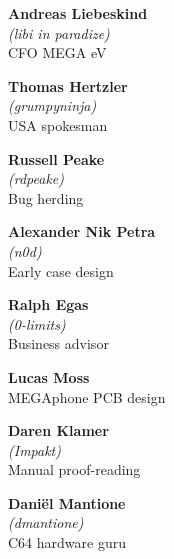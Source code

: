 \begin{mega65thanks}

\begin{minipage}{\linewidth}
  {\large\bf Andreas Liebeskind} \\
  \textit{(libi in paradize)} \\
  CFO MEGA eV
\end{minipage}

\begin{minipage}{\linewidth}
  {\large\bf Thomas Hertzler} \\
  \textit{(grumpyninja)} \\
  USA spokesman
\end{minipage}

\begin{minipage}{\linewidth}
  {\large\bf Russell Peake} \\
  \textit{(rdpeake)} \\
  Bug herding
\end{minipage}

\begin{minipage}{\linewidth}
  {\large\bf Alexander Nik Petra} \\
  \textit{(n0d)} \\
  Early case design
\end{minipage}

\begin{minipage}{\linewidth}
  {\large\bf Ralph Egas} \\
  \textit{(0-limits)} \\
  Business advisor
\end{minipage}

\begin{minipage}{\linewidth}
  {\large\bf Lucas Moss} \\
  MEGAphone PCB design
\end{minipage}

\begin{minipage}{\linewidth}
  {\large\bf Daren Klamer} \\
  \textit{(Impakt)} \\
  Manual proof-reading
\end{minipage}

\begin{minipage}{\linewidth}
  {\large\bf Daniël Mantione}  \\
  \textit{(dmantione)} \\
  C64 hardware guru
\end{minipage}


\end{mega65thanks}
